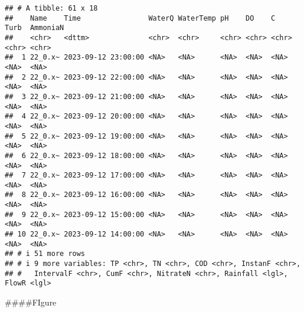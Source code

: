 \documentclass[
]{article}
\begin{document}
\begin{verbatim}
## # A tibble: 61 x 18
##    Name    Time                WaterQ WaterTemp pH    DO    C     Turb  AmmoniaN
##    <chr>   <dttm>              <chr>  <chr>     <chr> <chr> <chr> <chr> <chr>   
##  1 22_0.x~ 2023-09-12 23:00:00 <NA>   <NA>      <NA>  <NA>  <NA>  <NA>  <NA>    
##  2 22_0.x~ 2023-09-12 22:00:00 <NA>   <NA>      <NA>  <NA>  <NA>  <NA>  <NA>    
##  3 22_0.x~ 2023-09-12 21:00:00 <NA>   <NA>      <NA>  <NA>  <NA>  <NA>  <NA>    
##  4 22_0.x~ 2023-09-12 20:00:00 <NA>   <NA>      <NA>  <NA>  <NA>  <NA>  <NA>    
##  5 22_0.x~ 2023-09-12 19:00:00 <NA>   <NA>      <NA>  <NA>  <NA>  <NA>  <NA>    
##  6 22_0.x~ 2023-09-12 18:00:00 <NA>   <NA>      <NA>  <NA>  <NA>  <NA>  <NA>    
##  7 22_0.x~ 2023-09-12 17:00:00 <NA>   <NA>      <NA>  <NA>  <NA>  <NA>  <NA>    
##  8 22_0.x~ 2023-09-12 16:00:00 <NA>   <NA>      <NA>  <NA>  <NA>  <NA>  <NA>    
##  9 22_0.x~ 2023-09-12 15:00:00 <NA>   <NA>      <NA>  <NA>  <NA>  <NA>  <NA>    
## 10 22_0.x~ 2023-09-12 14:00:00 <NA>   <NA>      <NA>  <NA>  <NA>  <NA>  <NA>    
## # i 51 more rows
## # i 9 more variables: TP <chr>, TN <chr>, COD <chr>, InstanF <chr>,
## #   IntervalF <chr>, CumF <chr>, NitrateN <chr>, Rainfall <lgl>, FlowR <lgl>
\end{verbatim}

\#\#\#\#FIgure
\end{document}
